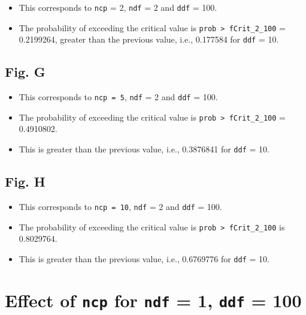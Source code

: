 \documentclass[]{book}
\providecommand{\tightlist}{%
  \setlength{\itemsep}{0pt}\setlength{\parskip}{0pt}}
\begin{document}
\begin{itemize}
\tightlist
\item
  This corresponds to \texttt{ncp} = 2, \texttt{ndf} = 2 and \texttt{ddf} = 100.
\item
  The probability of exceeding the critical value is \texttt{prob\ \textgreater{}\ fCrit\_2\_100} = 0.2199264, greater than the previous value, i.e., 0.177584 for \texttt{ddf} = 10.
\end{itemize}

\hypertarget{fig.-g}{%
\subsection{Fig. G}\label{fig.-g}}

\begin{itemize}
\tightlist
\item
  This corresponds to \texttt{ncp\ =\ 5}, \texttt{ndf} = 2 and \texttt{ddf} = 100.
\item
  The probability of exceeding the critical value is \texttt{prob\ \textgreater{}\ fCrit\_2\_100} = 0.4910802.
\item
  This is greater than the previous value, i.e., 0.3876841 for \texttt{ddf} = 10.
\end{itemize}

\hypertarget{fig.-h}{%
\subsection{Fig. H}\label{fig.-h}}

\begin{itemize}
\tightlist
\item
  This corresponds to \texttt{ncp\ =\ 10}, \texttt{ndf} = 2 and \texttt{ddf} = 100.
\item
  The probability of exceeding the critical value is \texttt{prob\ \textgreater{}\ fCrit\_2\_100} is 0.8029764.
\item
  This is greater than the previous value, i.e., 0.6769776 for \texttt{ddf} = 10.
\end{itemize}

\hypertarget{effect-of-ncp-for-ndf-1-ddf-100}{%
\section{\texorpdfstring{Effect of \texttt{ncp} for \texttt{ndf} = 1, \texttt{ddf} = 100}{Effect of ncp for ndf = 1, ddf = 100}}\label{effect-of-ncp-for-ndf-1-ddf-100}}
\end{document}
